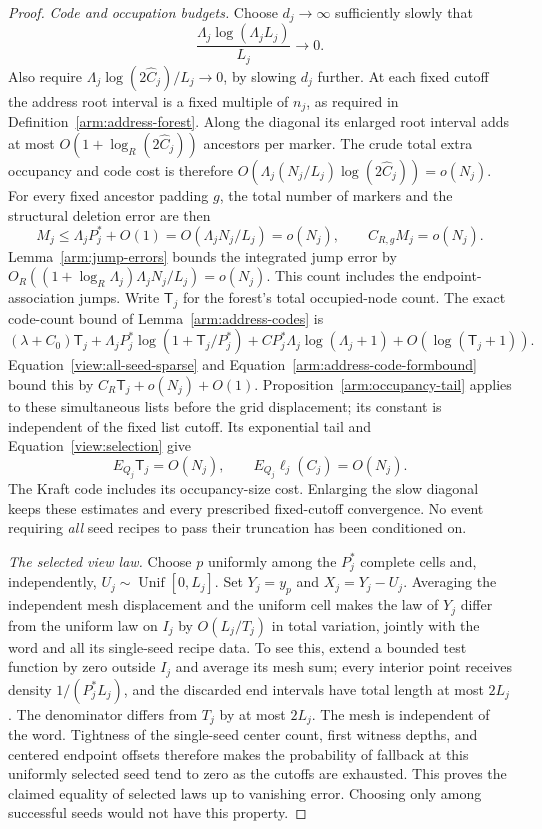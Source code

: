 \begin{proof}
\smallskip\noindent\emph{Code and occupation budgets.}
Choose $d_j\to\infty$ sufficiently slowly that
\begin{equation}\label{view:all-seed-sparse}
 \frac{\Lambda_j\log(\Lambda_jL_j)}{L_j}\longrightarrow0.
\end{equation}
Also require
$\Lambda_j\log(2\widehat C_j)/L_j\to0$, by slowing $d_j$ further.
At each fixed cutoff the address root interval is a fixed multiple
of $n_j$, as required in Definition~\ref{arm:address-forest}.
Along the diagonal its enlarged root interval adds at most
$O(1+\log_R(2\widehat C_j))$ ancestors per marker.  The crude total
extra occupancy and code cost is therefore
$O(\Lambda_j(N_j/L_j)\log(2\widehat C_j))=o(N_j)$.
For every fixed ancestor padding $g$, the total number of markers and
the structural deletion error are then
\[
 M_j\le \Lambda_jP_j^*+O(1)
       =O(\Lambda_jN_j/L_j)=o(N_j),\qquad
 C_{R,g}M_j=o(N_j).
\]
Lemma~\ref{arm:jump-errors} bounds the integrated jump error by
$O_R((1+\log_R\Lambda_j)\Lambda_jN_j/L_j)=o(N_j)$.
This count includes the endpoint-association jumps.  Write
$\mathsf T_j$ for the forest's total occupied-node count.  The exact
code-count bound of Lemma~\ref{arm:address-codes} is
\[
 (\lambda+C_0)\mathsf T_j+
 \Lambda_jP_j^*\log(1+\mathsf T_j/P_j^*)+
 C P_j^*\Lambda_j\log(\Lambda_j+1)+O(\log(\mathsf T_j+1)).
\]
Equation~\eqref{view:all-seed-sparse} and
Equation~\eqref{arm:address-code-formbound} bound this by
$C_R\mathsf T_j+o(N_j)+O(1)$.  Proposition~\ref{arm:occupancy-tail}
applies to these simultaneous lists before the grid displacement;
its constant is independent of the fixed list cutoff.  Its exponential
tail and Equation~\eqref{view:selection} give
\begin{equation}\label{view:all-seed-budget}
 E_{Q_j}\mathsf T_j=O(N_j),\qquad
 E_{Q_j}\ell_j(C_j)=O(N_j).
\end{equation}
The Kraft code includes its occupancy-size cost.  Enlarging the slow
diagonal keeps these estimates and every prescribed fixed-cutoff
convergence.  No event requiring \emph{all} seed recipes to pass their
truncation has been conditioned on.

\smallskip\noindent\emph{The selected view law.}
Choose $p$ uniformly among the $P_j^*$ complete cells and,
independently, $U_j\sim\operatorname{Unif}[0,L_j]$.  Set
$Y_j=y_p$ and $X_j=Y_j-U_j$.  Averaging the independent mesh displacement
and the uniform cell makes the law of $Y_j$ differ from the uniform law
on $I_j$ by $O(L_j/T_j)$ in total variation, jointly with the word and
all its single-seed recipe data.  To see this, extend a bounded test
function by zero outside $I_j$ and average its mesh sum; every interior
point receives density $1/(P_j^*L_j)$, and the discarded end intervals
have total length at most $2L_j$.  The denominator differs from $T_j$
by at most $2L_j$.  The mesh is independent of the word.  Tightness of
the single-seed center count, first witness depths, and centered
endpoint offsets therefore makes the probability of fallback at this
uniformly selected seed tend to zero as the cutoffs are exhausted.
This proves the claimed equality of selected laws up to vanishing
error.  Choosing only among successful seeds would not have this property.


\end{proof}
